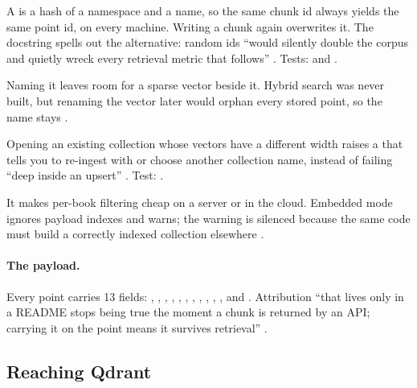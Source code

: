 \begin{description}[style=nextline]
  \item[Deterministic ids make ingestion idempotent.] A  is a hash of a namespace and a name, so the same chunk id always yields the same point id, on every machine. Writing a chunk again overwrites it. The docstring spells out the alternative: random ids \enquote{would silently double the corpus and quietly wreck every retrieval metric that follows} . Tests:  and .
  \item[The vector is named.] Naming it  leaves room for a sparse vector beside it. Hybrid search was never built, but renaming the vector later would orphan every stored point, so the name stays .
  \item[Dimension mismatches fail early.] Opening an existing collection whose vectors have a different width raises a  that tells you to re-ingest with  or choose another collection name, instead of failing \enquote{deep inside an upsert} . Test: .
  \item[A \code{book_slug} payload index is requested.] It makes per-book filtering cheap on a server or in the cloud. Embedded mode ignores payload indexes and warns; the warning is silenced because the same code must build a correctly indexed collection elsewhere .
\end{description}

\paragraph{The payload.} Every point carries 13 fields: , , , , , , , , , , ,  and  . Attribution \enquote{that lives only in a README stops being true the moment a chunk is returned by an API; carrying it on the point means it survives retrieval} .

\subsection{Reaching Qdrant}

